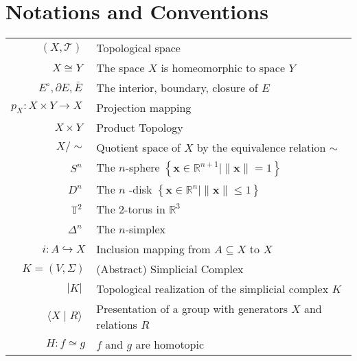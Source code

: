 \chapter*{Notations and Conventions}

\begin{tabular}{rl}
\(\left( {X,\mathcal{T}}\right) \;\) &Topological space \\

\(X \cong  Y\;\) &The space \(X\) is homeomorphic to space \(Y\) \\

\({E}^{ \circ  },\partial E,\bar{E}\;\) & The interior, boundary, closure of \(E\) \\

\({p}_{X}: X \times Y \to X\;\) & Projection mapping\\

\(X \times  Y\;\) & Product Topology\\

\(X/ \sim\) & Quotient space of \(X\) by the equivalence relation \(\sim\) \\

\({S}^{n}\;\) & The \(n\)-sphere \(\left\{  {\mathbf{x} \in  {\mathbb{R}}^{n + 1} \mid  \parallel \mathbf{x}\parallel  = 1}\right\}\)\\

\({D}^{n}\;\) & The \(n\) -disk \(\left\{  {\mathbf{x} \in  {\mathbb{R}}^{n} \mid  \parallel \mathbf{x}\parallel  \leq  1}\right\}\)\\

\({\mathbb{T}}^{2}\;\) & The $2$-torus in \({\mathbb{R}}^{3}\) \\

\({\Delta }^{n}\;\) & The \(n\)-simplex \\

\(i : A \hookrightarrow  X\) & Inclusion mapping from \(A \subseteq  X\) to \(X\)\\

\(K = \left( {V,\Sigma}\right)\) & (Abstract) Simplicial Complex\\

\(\left| K\right| \;\) &Topological realization of the simplicial complex \(K\)\\

\(\langle X \mid  R\rangle \;\) & Presentation of a group with generators $X$ and relations $R$ \\

\(H : f \simeq g\) & \(f\) and \(g\) are homotopic \\


\end{tabular}
